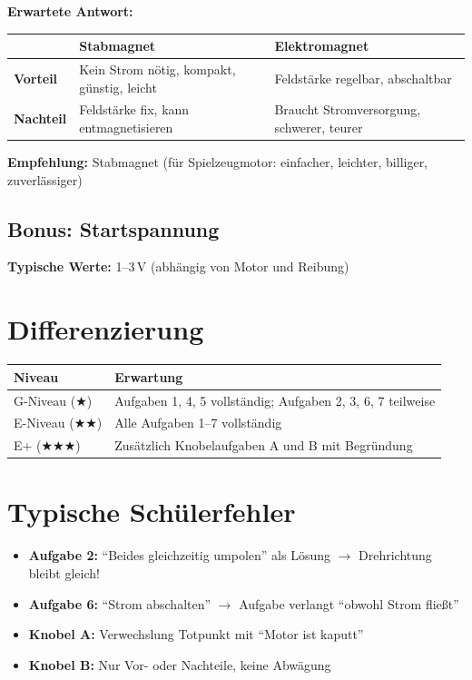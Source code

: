 \documentclass[11pt, a4paper]{article}
\begin{document}
\textbf{Erwartete Antwort:}

\begin{tabularx}{\textwidth}{@{}l|X|X@{}}
& \textbf{Stabmagnet} & \textbf{Elektromagnet} \\
\midrule
\textbf{Vorteil} & Kein Strom nötig, kompakt, günstig, leicht & Feldstärke regelbar, abschaltbar \\
\textbf{Nachteil} & Feldstärke fix, kann entmagnetisieren & Braucht Stromversorgung, schwerer, teurer \\
\end{tabularx}

\textbf{Empfehlung:} Stabmagnet (für Spielzeugmotor: einfacher, leichter, billiger, zuverlässiger)

\subsection*{Bonus: Startspannung}

\textbf{Typische Werte:} 1--3\,V (abhängig von Motor und Reibung)


\section*{Differenzierung}

\begin{tabularx}{\textwidth}{@{}l|X@{}}
\toprule
\textbf{Niveau} & \textbf{Erwartung} \\
\midrule
G-Niveau (★) & Aufgaben 1, 4, 5 vollständig; Aufgaben 2, 3, 6, 7 teilweise \\
E-Niveau (★★) & Alle Aufgaben 1--7 vollständig \\
E+ (★★★) & Zusätzlich Knobelaufgaben A und B mit Begründung \\
\bottomrule
\end{tabularx}


\section*{Typische Schülerfehler}

\begin{itemize}[noitemsep]
    \item \textbf{Aufgabe 2:} ``Beides gleichzeitig umpolen'' als Lösung $\rightarrow$ Drehrichtung bleibt gleich!
    \item \textbf{Aufgabe 6:} ``Strom abschalten'' $\rightarrow$ Aufgabe verlangt ``obwohl Strom fließt''
    \item \textbf{Knobel A:} Verwechslung Totpunkt mit ``Motor ist kaputt''
    \item \textbf{Knobel B:} Nur Vor- oder Nachteile, keine Abwägung
\end{itemize}
\end{document}
